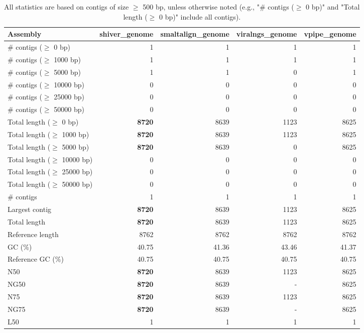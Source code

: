 \documentclass[12pt,a4paper]{article}
\begin{document}
\begin{table}[ht]
\begin{center}
\caption{All statistics are based on contigs of size $\geq$ 500 bp, unless otherwise noted (e.g., "\# contigs ($\geq$ 0 bp)" and "Total length ($\geq$ 0 bp)" include all contigs).}
\begin{tabular}{|l*{4}{|r}|}
\hline
Assembly & shiver\_genome & smaltalign\_genome & viralngs\_genome & vpipe\_genome \\ \hline
\# contigs ($\geq$ 0 bp) & 1 & 1 & 1 & 1 \\ \hline
\# contigs ($\geq$ 1000 bp) & 1 & 1 & 1 & 1 \\ \hline
\# contigs ($\geq$ 5000 bp) & 1 & 1 & 0 & 1 \\ \hline
\# contigs ($\geq$ 10000 bp) & 0 & 0 & 0 & 0 \\ \hline
\# contigs ($\geq$ 25000 bp) & 0 & 0 & 0 & 0 \\ \hline
\# contigs ($\geq$ 50000 bp) & 0 & 0 & 0 & 0 \\ \hline
Total length ($\geq$ 0 bp) & {\bf 8720} & 8639 & 1123 & 8625 \\ \hline
Total length ($\geq$ 1000 bp) & {\bf 8720} & 8639 & 1123 & 8625 \\ \hline
Total length ($\geq$ 5000 bp) & {\bf 8720} & 8639 & 0 & 8625 \\ \hline
Total length ($\geq$ 10000 bp) & 0 & 0 & 0 & 0 \\ \hline
Total length ($\geq$ 25000 bp) & 0 & 0 & 0 & 0 \\ \hline
Total length ($\geq$ 50000 bp) & 0 & 0 & 0 & 0 \\ \hline
\# contigs & 1 & 1 & 1 & 1 \\ \hline
Largest contig & {\bf 8720} & 8639 & 1123 & 8625 \\ \hline
Total length & {\bf 8720} & 8639 & 1123 & 8625 \\ \hline
Reference length & 8762 & 8762 & 8762 & 8762 \\ \hline
GC (\%) & 40.75 & 41.36 & 43.46 & 41.37 \\ \hline
Reference GC (\%) & 40.75 & 40.75 & 40.75 & 40.75 \\ \hline
N50 & {\bf 8720} & 8639 & 1123 & 8625 \\ \hline
NG50 & {\bf 8720} & 8639 & - & 8625 \\ \hline
N75 & {\bf 8720} & 8639 & 1123 & 8625 \\ \hline
NG75 & {\bf 8720} & 8639 & - & 8625 \\ \hline
L50 & 1 & 1 & 1 & 1 \\ \hline

\end{tabular}
\end{center}
\end{table}
\end{document}
